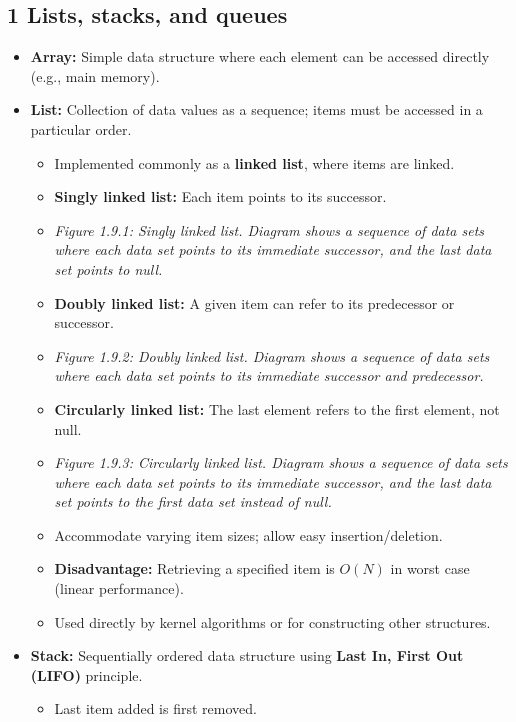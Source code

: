 \documentclass{article}
\begin{document}
\subsection*{1 Lists, stacks, and queues}
\begin{itemize}
    \item \textbf{Array:} Simple data structure where each element can be accessed directly (e.g., main memory).
    \item \textbf{List:} Collection of data values as a sequence; items must be accessed in a particular order.
    \begin{itemize}
        \item Implemented commonly as a \textbf{linked list}, where items are linked.
        \item \textbf{Singly linked list:} Each item points to its successor.
        \item \textit{Figure 1.9.1: Singly linked list. Diagram shows a sequence of data sets where each data set points to its immediate successor, and the last data set points to null.}
        \item \textbf{Doubly linked list:} A given item can refer to its predecessor or successor.
        \item \textit{Figure 1.9.2: Doubly linked list. Diagram shows a sequence of data sets where each data set points to its immediate successor and predecessor.}
        \item \textbf{Circularly linked list:} The last element refers to the first element, not null.
        \item \textit{Figure 1.9.3: Circularly linked list. Diagram shows a sequence of data sets where each data set points to its immediate successor, and the last data set points to the first data set instead of null.}
        \item Accommodate varying item sizes; allow easy insertion/deletion.
        \item \textbf{Disadvantage:} Retrieving a specified item is $O(N)$ in worst case (linear performance).
        \item Used directly by kernel algorithms or for constructing other structures.
    \end{itemize}
    \item \textbf{Stack:} Sequentially ordered data structure using \textbf{Last In, First Out (LIFO)} principle.
    \begin{itemize}
        \item Last item added is first removed.

\end{itemize}
\end{itemize}
\end{document}
